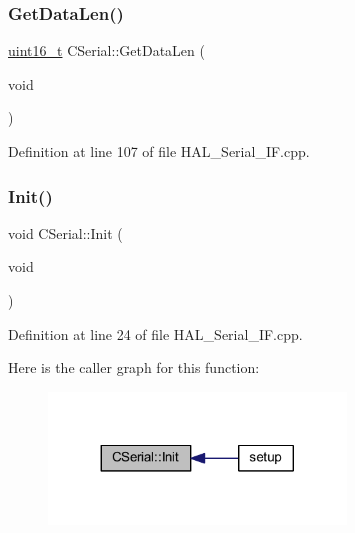 \subsubsection{\texorpdfstring{Get\+Data\+Len()}{GetDataLen()}}
{\footnotesize\ttfamily \mbox{\hyperlink{_a_d_a_s___types_8h_a1f1825b69244eb3ad2c7165ddc99c956}{uint16\+\_\+t}} C\+Serial\+::\+Get\+Data\+Len (\begin{DoxyParamCaption}\item[{void}]{ }\end{DoxyParamCaption})}



Definition at line 107 of file H\+A\+L\+\_\+\+Serial\+\_\+\+I\+F.\+cpp.

\mbox{\label{class_c_serial_aed500bd204c4b37665d6d228333edafb}} 
\subsubsection{\texorpdfstring{Init()}{Init()}}
{\footnotesize\ttfamily void C\+Serial\+::\+Init (\begin{DoxyParamCaption}\item[{void}]{ }\end{DoxyParamCaption})}



Definition at line 24 of file H\+A\+L\+\_\+\+Serial\+\_\+\+I\+F.\+cpp.

Here is the caller graph for this function\+:
\nopagebreak
\begin{figure}[H]
\begin{center}
\leavevmode
\includegraphics[width=224pt]{class_c_serial_aed500bd204c4b37665d6d228333edafb_icgraph}
\end{center}
\end{figure}
\mbox{\label{class_c_serial_a941e5cae2ca04518925a3b32f51110a6}} 
